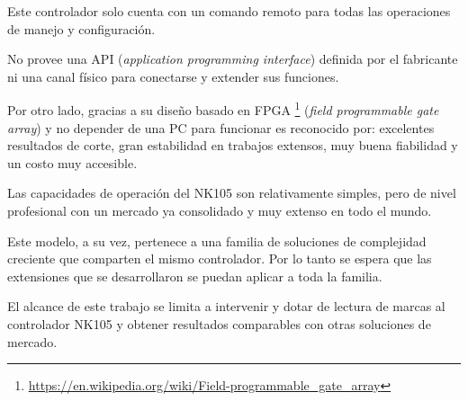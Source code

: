    Este controlador solo cuenta con un comando remoto para todas las operaciones de manejo y configuración.\par
   No provee una API (\textit{application programming interface}) definida por el fabricante ni una canal físico para conectarse y extender sus funciones. \par
   Por otro lado, gracias a su diseño basado en FPGA \footnote{\url{https://en.wikipedia.org/wiki/Field-programmable_gate_array}} (\textit{field programmable gate array}) y no depender de una PC para funcionar es reconocido por: excelentes resultados de corte, gran estabilidad en trabajos extensos, muy buena fiabilidad y un costo muy accesible. \par
   Las capacidades de operación del NK105 son relativamente simples, pero de nivel profesional con un mercado ya consolidado y muy extenso en todo el mundo.\par
   Este modelo, a su vez, pertenece a una familia de soluciones de complejidad creciente que comparten el mismo controlador. Por lo tanto se espera que las extensiones que se desarrollaron se puedan aplicar a toda la familia.\par
   El alcance de este trabajo se limita a intervenir y dotar de lectura de marcas al controlador NK105 y obtener resultados comparables con otras soluciones de mercado.

